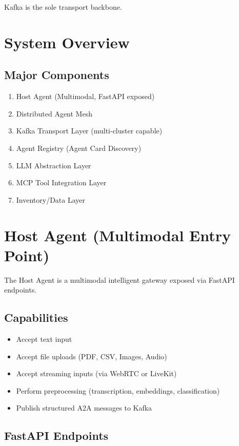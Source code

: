 \documentclass[12pt]{article}
\begin{document}
Kafka is the sole transport backbone.

\section{System Overview}

\subsection{Major Components}

\begin{enumerate}
    \item Host Agent (Multimodal, FastAPI exposed)
    \item Distributed Agent Mesh
    \item Kafka Transport Layer (multi-cluster capable)
    \item Agent Registry (Agent Card Discovery)
    \item LLM Abstraction Layer
    \item MCP Tool Integration Layer
    \item Inventory/Data Layer
\end{enumerate}

\section{Host Agent (Multimodal Entry Point)}

The Host Agent is a multimodal intelligent gateway exposed via FastAPI endpoints.

\subsection{Capabilities}

\begin{itemize}
    \item Accept text input
    \item Accept file uploads (PDF, CSV, Images, Audio)
    \item Accept streaming inputs (via WebRTC or LiveKit)
    \item Perform preprocessing (transcription, embeddings, classification)
    \item Publish structured A2A messages to Kafka
\end{itemize}

\subsection{FastAPI Endpoints}
\end{document}
